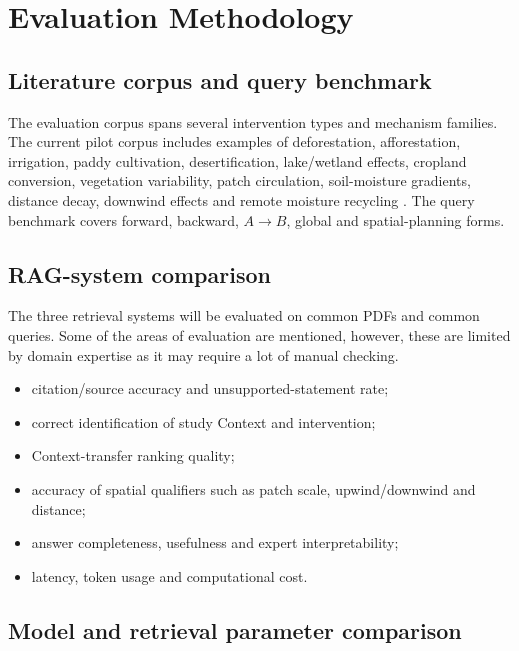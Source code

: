 \documentclass[10pt,twocolumn]{article}
\begin{document}
\section{Evaluation Methodology}

\subsection{Literature corpus and query benchmark}

The evaluation corpus spans several intervention types and mechanism families. The current pilot corpus includes examples of deforestation, afforestation, irrigation, paddy cultivation, desertification, lake/wetland effects, cropland conversion, vegetation variability, patch circulation, soil-moisture gradients, distance decay, downwind effects and remote moisture recycling \cite{shukla1990,duveiller2021,thiery2020,xue1993,taylor2011,froidevaux2014,cohn2019,keys2012,keys2016}. The query benchmark covers forward, backward, $A\rightarrow B$, global and spatial-planning forms.

\subsection{RAG-system comparison}

The three retrieval systems will be evaluated on common PDFs and common queries. Some of the areas of evaluation are mentioned, however, these are limited by domain expertise as it may require a lot of manual checking.

\begin{itemize}
  \item citation/source accuracy and unsupported-statement rate;
  \item correct identification of study Context and intervention;
  \item Context-transfer ranking quality;
  \item accuracy of spatial qualifiers such as patch scale, upwind/downwind and distance;
  \item answer completeness, usefulness and expert interpretability;
  \item latency, token usage and computational cost.
\end{itemize}

\subsection{Model and retrieval parameter comparison}
\end{document}
